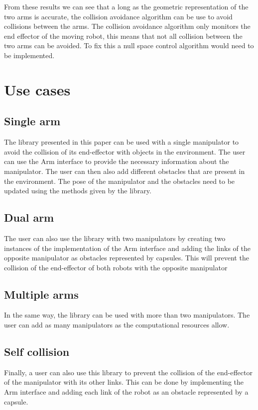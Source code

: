 \documentclass[a4paper, 11.5pt, conference]{ieeeconf}      %
\begin{document}
\pagebreak
From these results we can see that a long as the geometric representation of the two arms is accurate, the collision avoidance algorithm can be use to avoid collisions between the arms. The collision avoidance algorithm only monitors the end effector of the moving robot, this means that not all collision between the two arms can be avoided. To fix this a null space control algorithm would need to be implemented. 

\section{Use cases}

\subsection{Single arm} %
The library presented in this paper can be used with a single manipulator to avoid the collision of its end-effector with objects in the environment.
The user can use the Arm interface to provide the necessary information about the manipulator.
The user can then also add different obstacles that are present in the environment.
The pose of the manipulator and the obstacles need to be updated using the methods given by the library.
\subsection{Dual arm} %
The user can also use the library with two manipulators by creating two instances of the implementation of the Arm interface and adding the links of 
the opposite manipulator as obstacles represented by capsules.
This will prevent the collision of the end-effector of both robots with the opposite manipulator
\subsection{Multiple arms}
In the same way, the library can be used with more than two manipulators. The user can add as many manipulators as the computational resources allow.
\subsection{Self collision} %
Finally, a user can also use this library to prevent the collision of the end-effector of the manipulator with its other links.
This can be done by implementing the Arm interface and adding each link of the robot as an obstacle represented by a capsule.
\end{document}
